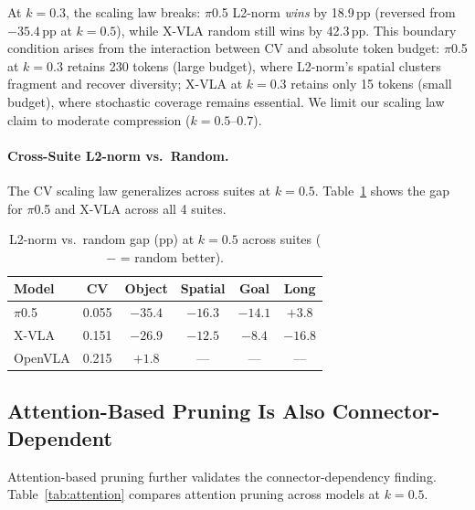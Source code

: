 \documentclass[10pt,twocolumn]{article}
\begin{document}
At $k\!=\!0.3$, the scaling law breaks: $\pi$0.5 L2-norm \emph{wins} by 18.9\,pp (reversed from $-35.4$\,pp at $k\!=\!0.5$), while X-VLA random still wins by 42.3\,pp.
This boundary condition arises from the interaction between CV and absolute token budget: $\pi$0.5 at $k\!=\!0.3$ retains 230 tokens (large budget), where L2-norm's spatial clusters fragment and recover diversity; X-VLA at $k\!=\!0.3$ retains only 15 tokens (small budget), where stochastic coverage remains essential.
We limit our scaling law claim to moderate compression ($k\!=\!0.5$--$0.7$).

\paragraph{Cross-Suite L2-norm vs.\ Random.}
The CV scaling law generalizes across suites at $k\!=\!0.5$.
Table~\ref{tab:cv_cross_suite} shows the gap for $\pi$0.5 and X-VLA across all 4 suites.

\begin{table}[t]
\centering
\caption{L2-norm vs.\ random gap (pp) at $k\!=\!0.5$ across suites ($-$ = random better).}
\label{tab:cv_cross_suite}
\small
\begin{tabular}{@{}lccccc@{}}
\toprule
Model & CV & Object & Spatial & Goal & Long \\
\midrule
$\pi$0.5 & 0.055 & $-35.4$ & $-16.3$ & $-14.1$ & $+3.8$ \\
X-VLA & 0.151 & $-26.9$ & $-12.5$ & $-8.4$ & $-16.8$ \\
OpenVLA & 0.215 & $+1.8$ & --- & --- & --- \\
\bottomrule
\end{tabular}
\end{table}

\subsection{Attention-Based Pruning Is Also Connector-Dependent}
\label{sec:attention}

Attention-based pruning further validates the connector-dependency finding.
Table~\ref{tab:attention} compares attention pruning across models at $k\!=\!0.5$.
\end{document}
